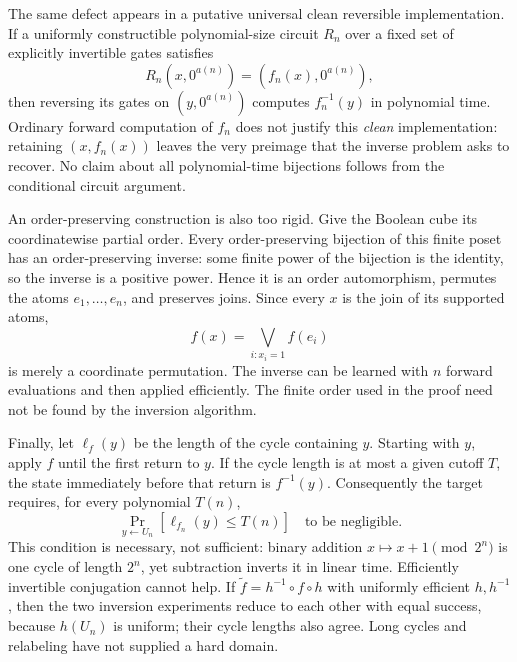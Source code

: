 \documentclass[11pt,a4paper]{article}
\numberwithin{equation}{section}
\begin{document}
The same defect appears in a putative universal clean reversible
implementation. If a uniformly constructible polynomial-size circuit
$R_n$ over a fixed set of explicitly invertible gates satisfies
\[
 R_n(x,0^{a(n)})=(f_n(x),0^{a(n)}),
\]
then reversing its gates on $(y,0^{a(n)})$ computes $f_n^{-1}(y)$ in
polynomial time. Ordinary forward computation of $f_n$ does not justify
this \emph{clean} implementation: retaining $(x,f_n(x))$ leaves the very
preimage that the inverse problem asks to recover. No claim about all
polynomial-time bijections follows from the conditional circuit argument.

An order-preserving construction is also too rigid. Give the Boolean
cube its coordinatewise partial order. Every order-preserving bijection
of this finite poset has an order-preserving inverse: some finite power
of the bijection is the identity, so the inverse is a positive power.
Hence it is an order automorphism, permutes the atoms $e_1,\ldots,e_n$,
and preserves joins. Since every $x$ is the join of its supported atoms,
\[
 f(x)=\bigvee_{i:x_i=1}f(e_i)
\]
is merely a coordinate permutation. The inverse can be learned with
$n$ forward evaluations and then applied efficiently. The finite order
used in the proof need not be found by the inversion algorithm.

Finally, let $\ell_f(y)$ be the length of the cycle containing $y$.
Starting with $y$, apply $f$ until the first return to $y$. If the cycle
length is at most a given cutoff $T$, the state immediately before that
return is $f^{-1}(y)$. Consequently the target requires, for every
polynomial $T(n)$,
\begin{equation}\label{eq:statement:cycles}
 \Pr_{y\leftarrow U_n}[\ell_{f_n}(y)\le T(n)]
        \quad\text{to be negligible.}
\end{equation}
This condition is necessary, not sufficient: binary addition
$x\mapsto x+1\pmod{2^n}$ is one cycle of length $2^n$, yet subtraction
inverts it in linear time. Efficiently invertible conjugation cannot
help. If $\widetilde f=h^{-1}\circ f\circ h$ with uniformly efficient
$h,h^{-1}$, then the two inversion experiments reduce to each other
with equal success, because $h(U_n)$ is uniform; their cycle lengths
also agree. Long cycles and relabeling have not supplied a hard domain.
\end{document}
